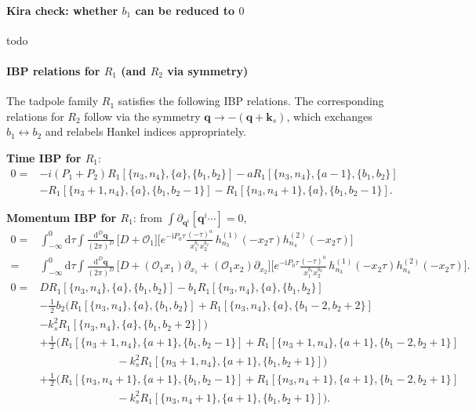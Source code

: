 \documentclass[a4paper,12pt]{article}
\newcommand{\FR}[2]{\displaystyle\frac{\,{#1}\,}{#2}}
\def\di{{\mathrm{d}}}
\def\pd{\partial}
\def\ii{\mathrm{i}}
\def\to{\rightarrow}
\begin{document}
\paragraph{Kira check: whether $b_1$ can be reduced to $0$}
todo


\paragraph{IBP relations for $R_1$ (and $R_2$ via symmetry)}
The tadpole family $R_1$ satisfies the following IBP relations. The corresponding relations for $R_2$ follow via the symmetry $\bm q \to -(\bm q+\bm k_s)$, which exchanges $b_1\leftrightarrow b_2$ and relabels Hankel indices appropriately.

\textbf{Time IBP for $R_1$}:
\begin{align}
	0 = & -i(P_1+P_2) R_1[\{n_3,n_4\},\{a\},\{b_1,b_2\}] - a R_1[\{n_3,n_4\},\{a-1\},\{b_1,b_2\}] \nonumber       \\
	    & - R_1[\{n_3+1,n_4\},\{a\},\{b_1,b_2-1\}] - R_1[\{n_3,n_4+1\},\{a\},\{b_1,b_2-1\}]. \label{eq:R1timeIBP}
\end{align}

\textbf{Momentum IBP for $R_1$}:
from $\int \pd_{\bm q^i}[\bm q^i\cdots]=0$,
\begin{align}
	0 ={}& \int_{-\infty}^0 \di\tau\int \FR{\di^D \bm q}{(2\pi)^D}\,
	\Big[D+\mathcal{O}_1\Big]\Bigg[
	e^{-\ii P_0\tau}\frac{(-\tau)^{a}}{x_1^{b_1}x_2^{b_2}}\,
	h_{n_3}^{(1)}(-x_2\tau)h_{n_4}^{(2)}(-x_2\tau)\Bigg] \nonumber\\
	={}& \int_{-\infty}^0 \di\tau\int \FR{\di^D \bm q}{(2\pi)^D}\,
	\Big[D+(\mathcal{O}_1 x_1)\partial_{x_1}+(\mathcal{O}_1 x_2)\partial_{x_2}\Big]\Bigg[
	e^{-\ii P_0\tau}\frac{(-\tau)^{a}}{x_1^{b_1}x_2^{b_2}}\,
	h_{n_3}^{(1)}(-x_2\tau)h_{n_4}^{(2)}(-x_2\tau)\Bigg]. \label{eq:R1momIBP_chainrule}
\end{align}
\begin{align}
	0 = & D R_1[\{n_3,n_4\},\{a\},\{b_1,b_2\}] - b_1 R_1[\{n_3,n_4\},\{a\},\{b_1,b_2\}] \nonumber                    \\
	    & - \FR12 b_2\Big( R_1[\{n_3,n_4\},\{a\},\{b_1,b_2\}] + R_1[\{n_3,n_4\},\{a\},\{b_1-2,b_2+2\}] \nonumber     \\
	    & -k_s^2 R_1[\{n_3,n_4\},\{a\},\{b_1,b_2+2\}] \Big) \nonumber                                                \\
	    & + \FR12 \Big(
	    R_1[\{n_3+1,n_4\},\{a+1\},\{b_1,b_2-1\}] + R_1[\{n_3+1,n_4\},\{a+1\},\{b_1-2,b_2+1\}] \nonumber\\
	    &\qquad\qquad\qquad\quad -k_s^2 R_1[\{n_3+1,n_4\},\{a+1\},\{b_1,b_2+1\}]
	    \Big) \nonumber\\
	    & + \FR12 \Big(
	    R_1[\{n_3,n_4+1\},\{a+1\},\{b_1,b_2-1\}] + R_1[\{n_3,n_4+1\},\{a+1\},\{b_1-2,b_2+1\}] \nonumber\\
	    &\qquad\qquad\qquad\quad -k_s^2 R_1[\{n_3,n_4+1\},\{a+1\},\{b_1,b_2+1\}]
	    \Big). \label{eq:R1momIBP}
\end{align}
\end{document}
